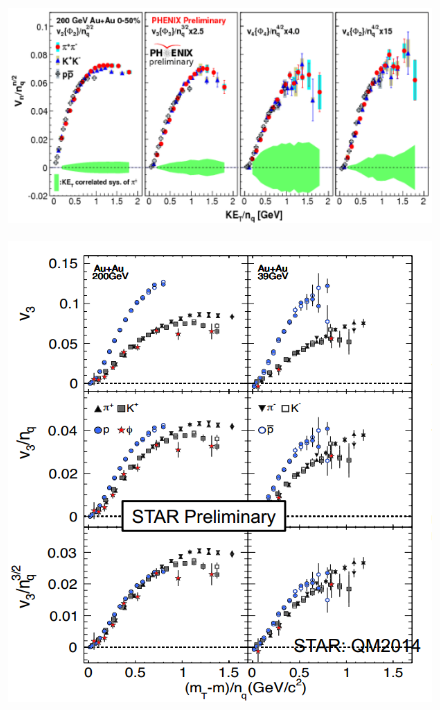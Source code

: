 \documentclass{beamer}
\begin{document}
\begin{frame}
\begin{center}
\begin{figure}[H]
	\centering
    		\includegraphics[scale=0.26]{pic/vn_nqn}
\end{figure}
\end{center}
\end{frame}

\begin{frame}
\begin{center}
\begin{figure}[H]
	\centering
    		\includegraphics[scale=0.35]{pic/v3_scal}
\end{figure}
\end{center}
\end{frame}
\end{document}
